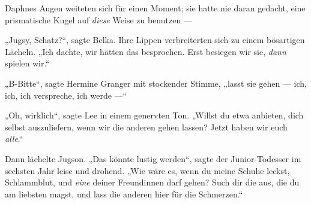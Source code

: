 Daphnes Augen weiteten sich für einen Moment; sie hatte nie daran gedacht, eine prismatische Kugel auf \emph{diese} Weise zu benutzen —

„Jugsy, Schatz?“, sagte Belka. Ihre Lippen verbreiterten sich zu einem bösartigen Lächeln.
„Ich dachte, wir hätten das besprochen. Erst besiegen wir sie, \emph{dann} spielen wir.“

„B-Bitte“, sagte Hermine Granger mit stockender Stimme, „lasst sie gehen — ich, ich, ich verspreche, ich werde —“

„Oh, wirklich“, sagte Lee in einem genervten Ton.
„Willst du etwa anbieten, dich selbst auszuliefern, wenn wir die anderen gehen lassen? Jetzt haben wir euch \emph{alle}.“

Dann lächelte Jugson.
„Das könnte lustig werden“, sagte der Junior-Todesser im sechsten Jahr leise und drohend.
„Wie wäre es, wenn du meine Schuhe leckst, Schlammblut, und \emph{eine} deiner Freundinnen darf gehen? Such dir die aus, die du am liebsten magst, und lass die anderen hier für die Schmerzen.“

